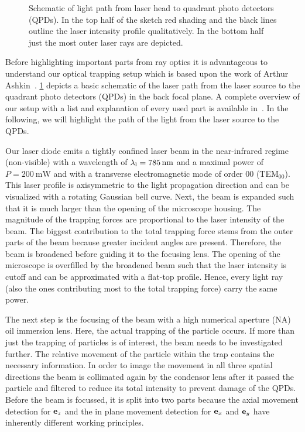 \begin{figure}[tbp]
  \centering
  
  \caption{Schematic of light path from laser head to quadrant photo detectors 
  (QPDs). In the top half of the sketch red shading and the black lines outline 
the laser intensity profile qualitatively. In the bottom half just the most 
outer laser rays are depicted.}
  \label{fig:TO-setup}
\end{figure}

Before highlighting important parts from ray optics it is advantageous to 
understand our optical trapping setup which is based upon the work of Arthur 
Ashkin~\cite{Ashkin1978,Ashkin1987,Ashkin2002,Ashkin1986,Ashkin1992,Ashkin1997}. 
\cref{fig:TO-setup} depicts a basic schematic of the laser path from the laser 
source to the quadrant photo detectors (QPDs) in the back focal plane. A 
complete overview of our setup with a list and explanation of every used part 
is available in~\cite{Lamprecht2017}. In the following, we will highlight the 
path of the light from the laser source to the QPDs.

Our laser diode emits a tightly confined laser beam in the near-infrared regime 
(non-visible) with a wavelength of $\lal=\SI{785}{\nm}$ and a maximal power of 
$P=\SI{200}{\milli\watt}$ and with a transverse electromagnetic mode of order 
00 (TEM$_{00}$). This laser profile is axisymmetric to the light propagation 
direction and can be visualized with a rotating Gaussian bell curve. Next, the 
beam is expanded such that it is much larger than the opening of the microscope 
housing. The magnitude of the trapping forces are proportional to the laser 
intensity of the beam. The biggest contribution to the total trapping force 
stems from the outer parts of the beam because greater incident angles are 
present. Therefore, the beam is broadened before guiding it to the focusing 
lens. The opening of the microscope is overfilled by the broadened beam such 
that the laser intensity is cutoff and can be approximated with a flat-top 
profile. Hence, every light ray (also the ones contributing most to the total 
trapping force) carry the same power.

The next step is the focusing of the beam with a high numerical aperture (NA) 
oil immersion lens. Here, the actual trapping of the particle occurs. If more 
than just the trapping of particles is of interest, the beam needs to be 
investigated further. The relative movement of the particle within the trap 
contains the necessary information. In order to image the movement in all three 
spatial directions the beam is collimated again by the condensor lens after it 
passed the particle and filtered to reduce its total intensity to prevent 
damage of the QPDs. Before the beam is focussed, it is split into two parts 
because the axial movement detection for $\vb{e}_{z}$ and the in plane movement 
detection for $\vb{e}_{x}$ and $\vb{e}_{y}$ have inherently different working principles.

